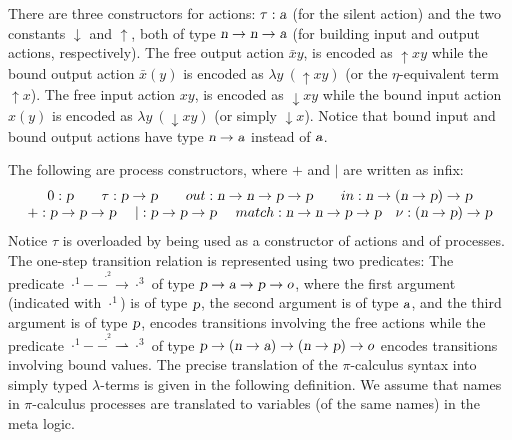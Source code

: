 \documentclass{acmtrans2m}
\newcommand{\action}{\hbox{\sl a}}
\newcommand{\inact}{\mathop{\downarrow}}
\newcommand{\name}{\hbox{\sl n}}
\newcommand{\one  }[3]{#1\stackrel{#2}{-\!\!-\!\!\!\rightarrow    } #3}
\newcommand{\onep }[3]{#1\stackrel{#2}{-\!\!-\!\!\!\rightharpoonup} #3}
\newcommand{\outact}{\mathop{\uparrow}}
\newcommand{\proc}{\hbox{\sl p}}
\newcommand{\ra}{\rightarrow}
\begin{document}
There are three constructors for actions: $\tau : \action$ (for the
silent action) and the two constants $\inact$ and $\outact$, both of
type $\name \ra \name \ra \action$ (for building input and output
actions, respectively).  The free output action $\bar{x}y$, is encoded
as $\outact x y$ while the bound output action $\bar{x}(y)$ is encoded
as $\lambda y\ (\outact x y)$ (or the $\eta$-equivalent term $\outact
x$).  The free input action $x y$, is encoded as $\inact x y$ while
the bound input action $x(y)$ is encoded as $\lambda y\ (\inact x y)$
(or simply $\inact x$).  Notice that bound input and bound output actions
have type $\name\ra\action$ instead of $\action$.

The following are process constructors, where $+$ and $|$ are written
as infix: 
$$
\begin{array}{c}
0 : \proc \qquad
\tau : \proc \ra \proc \qquad
{out} : \name\ra\name\ra\proc\ra\proc \qquad 
{in} : \name\ra (\name \ra \proc)\ra \proc \\
+ : \proc\ra\proc\ra \proc \quad\ 
| : \proc\ra\proc\ra\proc \quad\ 
match : \name\ra\name\ra\proc\ra\proc \quad\hfil
\nu : (\name\ra\proc)\ra\proc
\end{array}
$$
Notice $\tau$ is overloaded by being used as a constructor
of actions and of processes.
The one-step transition relation is represented using two predicates:
The predicate $\one{\cdot^1}{\cdot^2}{\cdot^3}$ of type
$\proc\ra\action\ra\proc\ra o$, where the first argument (indicated with $\cdot^1$)
is of type $\proc$, the second argument is of type $\action$, and
the third argument is of type $\proc$, 
encodes transitions involving the free actions while the 
predicate $\onep{\cdot^1}{\cdot^2}{\cdot^3}$ of type
$\proc\ra(\name\ra\action)\ra(\name\ra\proc)\ra o$ encodes transitions
involving bound values.  The precise translation of the $\pi$-calculus
syntax into simply typed $\lambda$-terms is given in the following
definition. We assume that names in $\pi$-calculus processes are
translated to variables (of the same names) in the meta logic. 
\end{document}
